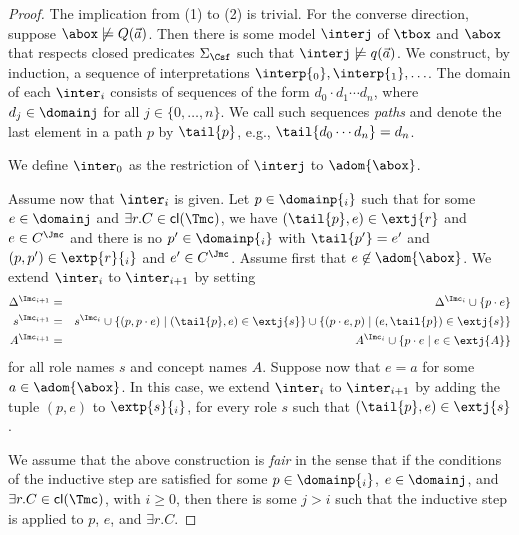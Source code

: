 \documentclass{lmcs}
\theoremstyle{definition}
\begin{document}
\begin{proof}
The implication from (1) to (2) is trivial. 
For the converse direction, suppose $\abox\not\models Q(\vec{a})$.
  Then there is some model $\interj$ of $\tbox$ and $\abox$ that respects closed predicates 
  $\Sigma_\Csf$ such that $\interj\not\models q(\vec{a})$. We construct, by 
  induction, a sequence of interpretations 
  $\interp{_0},\interp{_1},\ldots$. The domain of each $\inter_{i}$ 
  consists of sequences of the form $d_{0}\cdot d_{1}\cdots d_{n}$, 
  where $d_{j}\in\domainj$ for all $j\in\{0,\ldots,n\}$. We call such 
  sequences \emph{paths} and denote the last element in a path $p$ by 
  $\tail{p}$, e.g., $\tail{d_{0}\cdots d_{n}}=d_{n}$.
  
  We define $\inter_0$ as the restriction of $\interj$ to
  $\adom{\abox}$.
  
  Assume now that $\inter_i$ is given. Let $p\in\domainp{_i}$ 
  such that for some $e\in\domainj$ and $\exists r.C\in {\sf cl}(\Tmc)$, we have 
  $(\tail{p},e)\in\extj{r}$ and $e\in C^{\Jmc}$ and there is no $p'\in\domainp{_{i}}$ with 
  $\tail{p'}=e'$ and $(p,p')\in\extp{r}{_{i}}$ and $e'\in C^{\Jmc}$. Assume first that 
  $e\not\in\adom{\abox}$. We extend $\inter_i$ to $\inter_{i+1}$ by setting
\begin{eqnarray*}
\Delta^{\Imc_{i+1}} & = & \Delta^{\Imc_{i}}\cup \{p\cdot e\}\\
s^{\Imc_{i+1}} & = & s^{\Imc_{i}} \cup \{ (p,p\cdot e) \mid (\tail{p},e)\in\extj{s}\}\cup
\{ (p\cdot e,p) \mid (e,\tail{p}) \in\extj{s}\}\\
A^{\Imc_{i+1}} & = & A^{\Imc_{i}} \cup \{ p\cdot e \mid e\in\extj{A}\}
\end{eqnarray*}
for all role names $s$ and concept names $A$. Suppose now that $e=a$ for some $a\in\adom{\abox}$. In this case, we 
  extend $\inter_i$ to $\inter_{i+1}$ by adding the tuple $(p,e)$ to 
  $\extp{s}{_i}$, for every role $s$ such that 
  $(\tail{p},e)\in\extj{s}$.
  
  We assume that the above construction is \emph{fair} in the sense that 
  if the conditions of the inductive step are satisfied for some 
  $p\in\domainp{_{i}}$, $e\in\domainj$, and $\exists r.C\in {\sf cl}(\Tmc)$, with $i\geq 0$, 
  then there is some $j > i$ such that the inductive step is applied to 
  $p$, $e$, and $\exists r.C$.
  

\end{proof}
\end{document}
